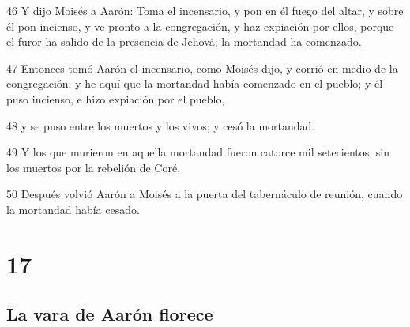 \par 46 Y dijo Moisés a Aarón: Toma el incensario, y pon en él fuego del altar, y sobre él pon incienso, y ve pronto a la congregación, y haz expiación por ellos, porque el furor ha salido de la presencia de Jehová; la mortandad ha comenzado.
\par 47 Entonces tomó Aarón el incensario, como Moisés dijo, y corrió en medio de la congregación; y he aquí que la mortandad había comenzado en el pueblo; y él puso incienso, e hizo expiación por el pueblo,
\par 48 y se puso entre los muertos y los vivos; y cesó la mortandad.
\par 49 Y los que murieron en aquella mortandad fueron catorce mil setecientos, sin los muertos por la rebelión de Coré.
\par 50 Después volvió Aarón a Moisés a la puerta del tabernáculo de reunión, cuando la mortandad había cesado.

\chapter{17}

\section*{La vara de Aarón florece}

